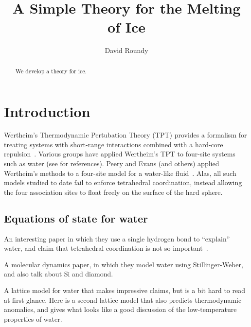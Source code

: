 \documentclass[letterpaper,twocolumn,amsmath,amssymb,pre]{revtex4-1}
\begin{document}
\title{A Simple Theory for the Melting of Ice}

\author{David Roundy}
\begin{abstract}
  We develop a theory for ice.
\end{abstract}

\maketitle


\section{Introduction}

Wertheim's Thermodynamic Pertubation Theory (TPT) provides a formalism
for treating systems with short-range interactions combined with a
hard-core repulsion~\cite{wertheim1984fluidsI, *wertheim1984fluidsII,
  *wertheim1986fluidsIII}.  Various groups have
applied Wertheim's TPT to four-site systems such as water (see
\cite{peery2003association} for references).  Peery and Evans (and
others) applied Wertheim's methods to a four-site model for a
water-like fluid~\cite{peery2003association}.  Alas, all such models
studied to date fail to enforce tetrahedral coordination, instead
allowing the four association sites to float freely on the surface of
the hard sphere.

\subsection{Equations of state for water}

An interesting paper in which they use a single hydrogen bond to
``explain'' water, and claim that tetrahedral coordination is not so
important~\cite{truskett1999single}.

A molecular dynamics paper, in which they  model water using
Stillinger-Weber, and also talk about Si and
diamond\cite{molinero2008water, *hujo2011rise}.

A lattice model for water that makes impressive claims, but is a bit
hard to read at first glance\cite{hakem2007temperature}.  Here is a
second lattice model that also predicts thermodynamic anomalies, and
gives what looks like a good discussion of the low-temperature
properties of water\cite{pretti2004thermodynamic}.
\end{document}
